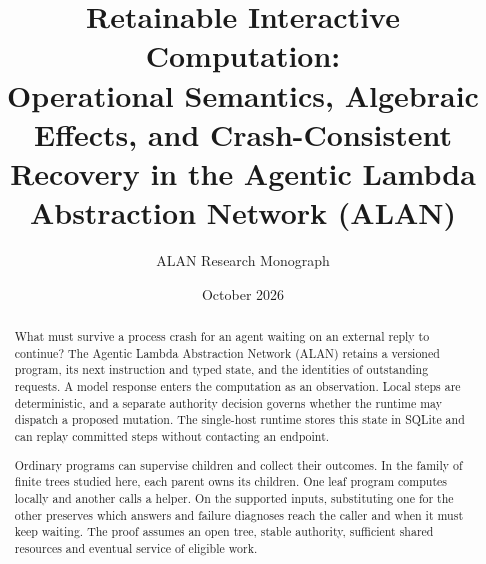 \documentclass[11pt,a4paper]{article}
\title{\textbf{Retainable Interactive Computation:\\Operational Semantics, Algebraic Effects, and Crash-Consistent Recovery in the Agentic Lambda Abstraction Network (ALAN)}}
\author{ALAN Research Monograph}
\date{October 2026}
\theoremstyle{definition}
\theoremstyle{remark}
\begin{document}
\maketitle

\begin{abstract}
What must survive a process crash for an agent waiting on an external reply to continue? The Agentic Lambda Abstraction Network (ALAN) retains a versioned program, its next instruction and typed state, and the identities of outstanding requests. A model response enters the computation as an observation. Local steps are deterministic, and a separate authority decision governs whether the runtime may dispatch a proposed mutation. The single-host runtime stores this state in SQLite and can replay committed steps without contacting an endpoint.

Ordinary programs can supervise children and collect their outcomes. In the family of finite trees studied here, each parent owns its children. One leaf program computes locally and another calls a helper. On the supported inputs, substituting one for the other preserves which answers and failure diagnoses reach the caller and when it must keep waiting. The proof assumes an open tree, stable authority, sufficient shared resources and eventual service of eligible work.


\end{abstract}
\end{document}
